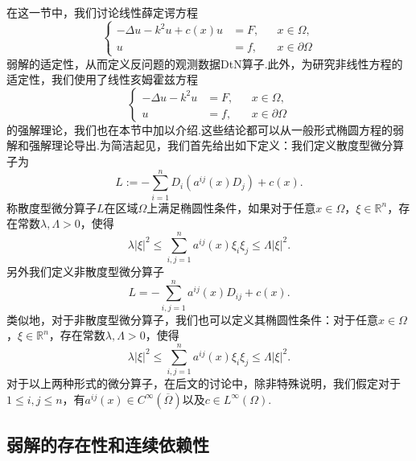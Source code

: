 在这一节中，我们讨论线性薛定谔方程
\begin{equation}\label{eq:schrodinger-0}
\left\{\begin{aligned}
-\Delta u - k^2 u +c(x)u &=F, && x\in\Omega,\\
u &=f, && x\in\partial\Omega
\end{aligned}\right.
\end{equation}
弱解的适定性，从而定义反问题的观测数据DtN算子.此外，为研究非线性方程的适定性，我们使用了线性亥姆霍兹方程
\begin{equation}\label{eqn:Helmholtz}
\left\{\begin{aligned}
-\Delta u - k^2 u &=F, && x\in\Omega,\\
u &=f, && x\in\partial\Omega
\end{aligned}\right.
\end{equation}
的强解理论，我们也在本节中加以介绍.这些结论都可以从一般形式椭圆方程的弱解和强解理论导出.为简洁起见，我们首先给出如下定义：我们定义散度型微分算子为
\begin{equation}\label{eq:divergence-form}
L:=-\sum_{i=1}^n D_i(a^{ij}(x)D_{j})+c(x).
\end{equation}
称散度型微分算子$L$在区域$\Omega$上满足椭圆性条件，如果对于任意$x\in\Omega$，$\xi\in\mathbb{R}^n$，存在常数$\lambda,\Lambda>0$，使得
\begin{equation}\label{eq:strict-elliptic}
\lambda |\xi|^2 \leq \sum_{i,j=1}^n a^{ij}(x)\xi_{i}\xi_{j} \leq \Lambda|\xi|^2 .
\end{equation}
另外我们定义非散度型微分算子
\begin{equation}\label{eq:nondivergence-form}
L=-\sum_{i,j=1}^{n}a^{ij}(x)D_{ij} + c(x).
\end{equation}
类似地，对于非散度型微分算子，我们也可以定义其椭圆性条件：对于任意$x\in\Omega$，$\xi\in\mathbb{R}^n$，存在常数$\lambda,\Lambda>0$，使得
\begin{equation*}
\lambda |\xi|^2 \leq \sum_{i,j=1}^n a^{ij}(x)\xi_{i}\xi_{j} \leq \Lambda|\xi|^2 .
\end{equation*}
对于以上两种形式的微分算子，在后文的讨论中，除非特殊说明，我们假定对于$1\leq i,j\leq n$，有$a^{ij}(x)\in C^{\infty}(\overline{\Omega})$以及$c\in L^{\infty}(\Omega)$.

\subsection{弱解的存在性和连续依赖性}\label{sec:weak-solution}

